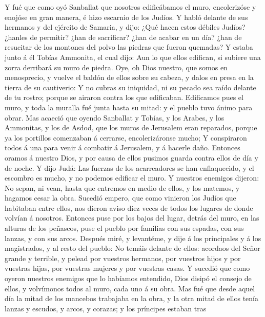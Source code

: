  Y fué que como oyó Sanballat que nosotros edificábamos el
muro, encolerizóse y enojóse en gran manera, é hizo escarnio de los
Judíos.  Y habló delante de sus hermanos y del ejército de
Samaria, y dijo: ¿Qué hacen estos débiles Judíos? ¿hanles de permitir?
¿han de sacrificar? ¿han de acabar en un día? ¿han de resucitar de los
montones del polvo las piedras que fueron quemadas?  Y
estaba junto á él Tobías Ammonita, el cual dijo: Aun lo que ellos
edifican, si subiere una zorra derribará su muro de piedra.
 Oye, oh Dios nuestro, que somos en menosprecio, y vuelve
el baldón de ellos sobre su cabeza, y dalos en presa en la tierra de su
cautiverio:  Y no cubras su iniquidad, ni su pecado sea
raído delante de tu rostro; porque se airaron contra los que edificaban.
 Edificamos pues el muro, y toda la muralla fué junta
hasta su mitad: y el pueblo tuvo ánimo para obrar.  Mas
acaeció que oyendo Sanballat y Tobías, y los Arabes, y los Ammonitas, y
los de Asdod, que los muros de Jerusalem eran reparados, porque ya los
portillos comenzaban á cerrarse, encolerizáronse mucho;  Y
conspiraron todos á una para venir á combatir á Jerusalem, y á hacerle
daño.  Entonces oramos á nuestro Dios, y por causa de
ellos pusimos guarda contra ellos de día y de noche.  Y
dijo Judá: Las fuerzas de los acarreadores se han enflaquecido, y el
escombro es mucho, y no podemos edificar el muro.  Y
nuestros enemigos dijeron: No sepan, ni vean, hasta que entremos en
medio de ellos, y los matemos, y hagamos cesar la obra. 
Sucedió empero, que como vinieron los Judíos que habitaban entre ellos,
nos dieron aviso diez veces de todos los lugares de donde volvían á
nosotros.  Entonces puse por los bajos del lugar, detrás
del muro, en las alturas de los peñascos, puse el pueblo por familias
con sus espadas, con sus lanzas, y con sus arcos. 
Después miré, y levantéme, y dije á los principales y á los magistrados,
y al resto del pueblo: No temáis delante de ellos: acordaos del Señor
grande y terrible, y pelead por vuestros hermanos, por vuestros hijos y
por vuestras hijas, por vuestras mujeres y por vuestras casas.
 Y sucedió que como oyeron nuestros enemigos que lo
habíamos entendido, Dios disipó el consejo de ellos, y volvímonos todos
al muro, cada uno á su obra.  Mas fué que desde aquel día
la mitad de los mancebos trabajaba en la obra, y la otra mitad de ellos
tenía lanzas y escudos, y arcos, y corazas; y los príncipes estaban tras
